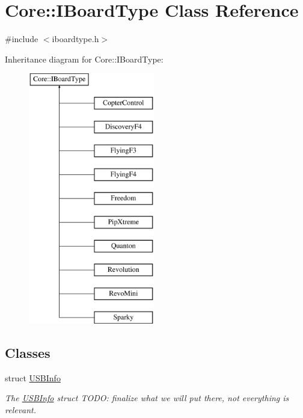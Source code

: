 \hypertarget{class_core_1_1_i_board_type}{\section{\-Core\-:\-:\-I\-Board\-Type \-Class \-Reference}
\label{class_core_1_1_i_board_type}
}


{\ttfamily \#include $<$iboardtype.\-h$>$}

\-Inheritance diagram for \-Core\-:\-:\-I\-Board\-Type\-:\begin{figure}[H]
\begin{center}
\leavevmode
\includegraphics[height=11.000000cm]{class_core_1_1_i_board_type}
\end{center}
\end{figure}
\subsection*{\-Classes}
\begin{DoxyCompactItemize}
\item 
struct \hyperlink{struct_core_1_1_i_board_type_1_1_u_s_b_info}{\-U\-S\-B\-Info}
\begin{DoxyCompactList}\small\item\em \-The \hyperlink{struct_core_1_1_i_board_type_1_1_u_s_b_info}{\-U\-S\-B\-Info} struct \-T\-O\-D\-O\-: finalize what we will put there, not everything is relevant. \end{DoxyCompactList}\end{DoxyCompactItemize}
